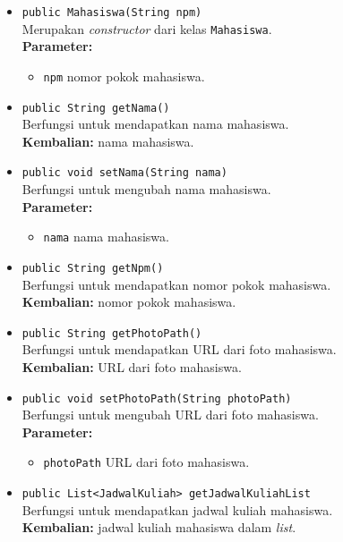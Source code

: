 \begin{itemize}
	\item \texttt{public Mahasiswa(String npm)}\\
	Merupakan \textit{constructor} dari kelas \texttt{Mahasiswa}.\\
	\textbf{Parameter:}
	\begin{itemize}
		\item \texttt{npm} nomor pokok mahasiswa.
	\end{itemize}
	
	\item \texttt{public String getNama()}\\
		Berfungsi untuk mendapatkan nama mahasiswa.\\
		\textbf{Kembalian:} nama mahasiswa.

	\item \texttt{public void setNama(String nama)}\\
		Berfungsi untuk mengubah nama mahasiswa.\\
		\textbf{Parameter:}
		\begin{itemize}
			\item \texttt{nama} nama mahasiswa.
		\end{itemize}

	\item \texttt{public String getNpm()}\\
		Berfungsi untuk mendapatkan nomor pokok mahasiswa.\\
		\textbf{Kembalian:} nomor pokok mahasiswa.
	
	\item \texttt{public String getPhotoPath()}\\
		Berfungsi untuk mendapatkan URL dari foto mahasiswa.\\
		\textbf{Kembalian:} URL dari foto mahasiswa.
	
	\item \texttt{public void setPhotoPath(String photoPath)}\\
		Berfungsi untuk mengubah URL dari foto mahasiswa.\\
        \textbf{Parameter:}
		\begin{itemize}
			\item \texttt{photoPath} URL dari foto mahasiswa.
		\end{itemize}	
		
	\item \texttt{public List<JadwalKuliah> getJadwalKuliahList}\\
		Berfungsi untuk mendapatkan jadwal kuliah mahasiswa.\\
		\textbf{Kembalian:} jadwal kuliah mahasiswa dalam \textit{list}.
	

\end{itemize}
